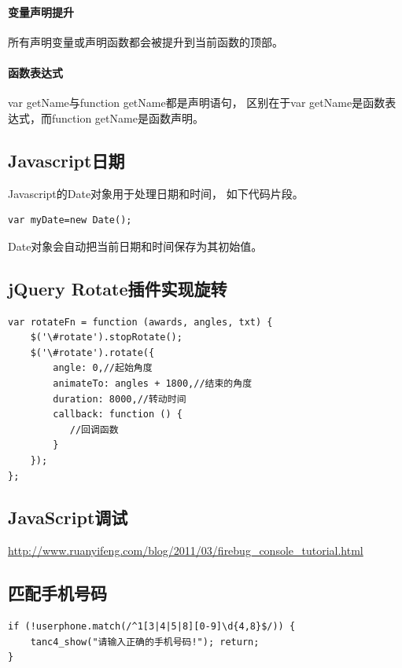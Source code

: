 \documentclass{book}
\begin{document}
\paragraph{变量声明提升}所有声明变量或声明函数都会被提升到当前函数的顶部。

\paragraph{函数表达式}var getName与function getName都是声明语句，
区别在于var getName是函数表达式，而function getName是函数声明。

\subsection{Javascript日期}

Javascript的Date对象用于处理日期和时间，
如下代码片段。

\begin{lstlisting}[language=VBScript]
var myDate=new Date();
\end{lstlisting}

Date对象会自动把当前日期和时间保存为其初始值。

\subsection{jQuery Rotate插件实现旋转}

\begin{lstlisting}[language=VBScript]
var rotateFn = function (awards, angles, txt) {
    $('\#rotate').stopRotate();
    $('\#rotate').rotate({
        angle: 0,//起始角度
        animateTo: angles + 1800,//结束的角度
        duration: 8000,//转动时间
        callback: function () {
           //回调函数
        }
    });
};
\end{lstlisting}

\subsection{JavaScript调试}

\url{http://www.ruanyifeng.com/blog/2011/03/firebug_console_tutorial.html}

\subsection{匹配手机号码}

\begin{lstlisting}[language=VBSCript]
if (!userphone.match(/^1[3|4|5|8][0-9]\d{4,8}$/)) {
    tanc4_show("请输入正确的手机号码!"); return;
}
\end{lstlisting}
\end{document}
